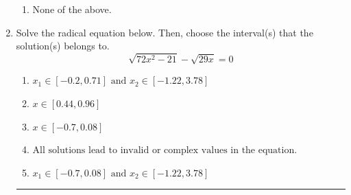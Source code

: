 \documentclass[14pt]{extbook}
\newcommand{\litem}[1]{\item#1\hspace*{-1cm}\rule{\textwidth}{0.4pt}}
\begin{document}
\begin{enumerate}
{\begin{enumerate}[label=\Alph*.]
\item None of the above.
\end{enumerate} }
\litem{
Solve the radical equation below. Then, choose the interval(s) that the solution(s) belongs to.\[ \sqrt{72 x^2 - 21} - \sqrt{29 x} = 0 \]\begin{enumerate}[label=\Alph*.]
\item \( x_1 \in [-0.2, 0.71] \text{ and } x_2 \in [-1.22,3.78] \)
\item \( x \in [0.44,0.96] \)
\item \( x \in [-0.7,0.08] \)
\item \( \text{All solutions lead to invalid or complex values in the equation.} \)
\item \( x_1 \in [-0.7, 0.08] \text{ and } x_2 \in [-1.22,3.78] \)


\end{enumerate}}
\end{enumerate}
\end{document}
